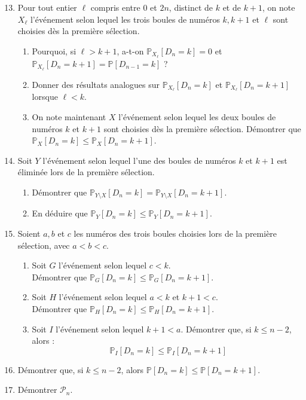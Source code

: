 \documentclass[landscape,twocolumn,leqno,a4paper,10pt]{report} %
\renewcommand{\leq}{\leqslant}
\newcommand{\Prob}{\mathbb{P}}
\begin{document}
\begin{enumerate}\setcounter{enumi}{12}
	\item Pour tout entier $\ell$ compris entre 0 et $2 n$, distinct de $k$ et de $k+1$, on note $X_{\ell}$ l'événement selon lequel les trois boules de numéros $k, k+1$ et $\ell$ sont choisies dès la première sélection.
	\begin{enumerate}
		\item Pourquoi, si $\ell>k+1$, a-t-on $\Prob_{X_{\ell}}\left[D_{n}=k\right]=0$ et $\Prob_{X_{\ell}}\left[D_{n}=k+1\right]=\Prob\left[D_{n-1}=k\right]$ ?
		\item Donner des résultats analogues sur $\Prob_{X_{\ell}}\left[D_{n}=k\right]$ et $\Prob_{X_{\ell}}\left[D_{n}=k+1\right]$ lorsque $\ell<k$.
		\item On note maintenant $X$ l'événement selon lequel les deux boules de numéros $k$ et $k+1$ sont choisies dès la première sélection. Démontrer que $\Prob_{X}\left[D_{n}=k\right] \leq \Prob_{X}\left[D_{n}=k+1\right]$.
	\end{enumerate}
	\item Soit $Y$ l'événement selon lequel l'une des boules de numéros $k$ et $k+1$ est éliminée lors de la première sélection.
	\begin{enumerate}
		\item Démontrer que $\Prob_{Y \setminus X}\left[D_{n}=k\right]=\Prob_{Y \setminus X}\left[D_{n}=k+1\right]$.
		\item En déduire que $\Prob_{Y}\left[D_{n}=k\right] \leq \Prob_{Y}\left[D_{n}=k+1\right]$.
	\end{enumerate}
	\item Soient $a, b$ et $c$ les numéros des trois boules choisies lors de la première sélection, avec $a<b<c$.
	\begin{enumerate}
		\item Soit $G$ l'événement selon lequel $c<k$.\\ 
		Démontrer que $\Prob_{G}\left[D_{n}=k\right] \leq \Prob_{G}\left[D_{n}=k+1\right]$.
		\item Soit $H$ l'événement selon lequel $a<k$ et $k+1<c$.\\ 
		Démontrer que $\Prob_{H}\left[D_{n}=k\right] \leq \Prob_{H}\left[D_{n}=k+1\right]$.
		\item Soit $I$ l'événement selon lequel $k+1<a$. Démontrer que, si $k \leq n-2$, alors :
		$$\Prob_{I}\left[D_{n}=k\right] \leq \Prob_{I}\left[D_{n}=k+1\right]$$
	\end{enumerate}
	\item Démontrer que, si $k \leq n-2$, alors $\Prob\left[D_{n}=k\right] \leq \Prob\left[D_{n}=k+1\right]$.
	\item Démontrer $\mathscr{P}_{n}$.
\end{enumerate}
\end{document}
